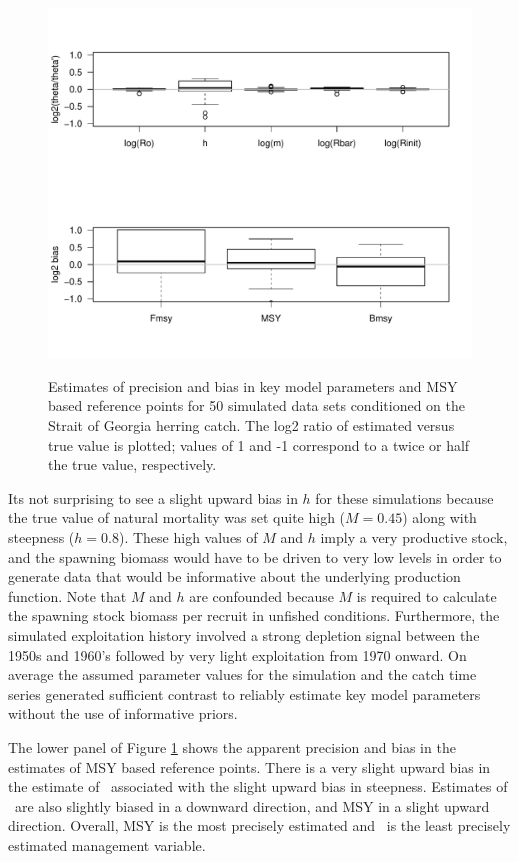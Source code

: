 \begin{figure}[!tbp]
	\includegraphics[width=\textwidth]{../Figs/SOGParameterBias.pdf}\\
	\caption{Estimates of precision and bias in key model parameters and MSY based reference points for 50 simulated data sets conditioned on the Strait of Georgia herring catch. The log2 ratio of estimated versus true value is plotted; values of 1 and -1 correspond to a twice or  half the true value, respectively.}\label{FigSogBias}
\end{figure}

Its not surprising to see a slight upward bias in $h$ for these simulations because the true value of natural mortality was set quite high ($M=0.45$) along with steepness ($h=0.8$). These high values of $M$ and $h$ imply a very productive stock, and the spawning biomass would have to be driven to very low levels in order to generate data that would be informative about the underlying production function.  Note that $M$ and $h$ are confounded because $M$ is required to calculate the spawning stock biomass per recruit in unfished conditions. Furthermore, the simulated exploitation history involved a strong depletion signal between the 1950s and 1960's followed by very light exploitation from 1970 onward.  On average the assumed parameter values for the simulation and the catch time series generated sufficient contrast to reliably estimate key model parameters without the use of informative priors.

The lower panel of Figure \ref{FigSogBias} shows the apparent precision and bias in the estimates of MSY based reference points.  There is a very slight upward bias in the estimate of \fmsy\ associated with the slight upward bias in steepness.  Estimates of \bmsy\ are also slightly biased in a downward direction, and MSY in a slight upward direction.  Overall, MSY is the most precisely estimated and \fmsy\ is the least precisely estimated management variable.


